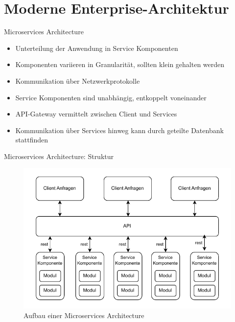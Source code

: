 \section{Moderne Enterprise-Architektur}


\begin{frame}{Microservices Architecture}
    \begin{itemize}
        \item Unterteilung der Anwendung in Service Komponenten
        \item Komponenten variieren in Granularität, sollten klein gehalten werden
        \item Kommunikation über Netzwerkprotokolle
        \item Service Komponenten sind unabhängig, entkoppelt voneinander
        \item API-Gateway vermittelt zwischen Client und Services
        \item Kommunikation über Services hinweg kann durch geteilte Datenbank stattfinden
    \end{itemize}
\end{frame}

\begin{frame}{Microservices Architecture: Struktur}
    \begin{figure}[!h]
        \centering
        \includegraphics[scale=0.55]{imglib/microservices/microservices}
        \caption{Aufbau einer Microservices Architecture}
        \label{fig:microservices}
    \end{figure}
\end{frame}

